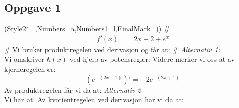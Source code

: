 \subsection*{Oppgave 1}
\begin{easylist}[enumerate]
	\ListProperties(Style2*=,Numbers=a,Numbers1=l,FinalMark={)})
	# \begin{align*}
		f'(x) &= 2x + 2 + e^x
	\end{align*}
	# Vi bruker produktregelen ved derivasjon og får at:
	# \textit{Alternativ 1: } \\
	Vi omskriver $ h(x) $ ved hjelp av potensregler:
Videre merker vi oss at av kjerneregelen er:
\[ \left(e^{-(2x+1)}\right)'=-2e^{-(2x+1)}\]
Av produktregelen får vi da at:
\textit{Alternativ 2}\\
Vi har at:
Av kvotientregelen ved derivasjon har vi da at:

\end{easylist}


